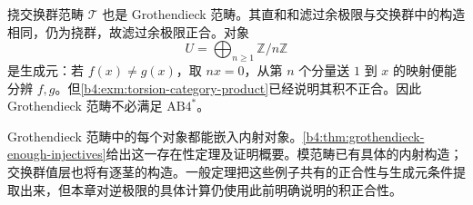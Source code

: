 \begin{example}\label{b4:exm:torsion-grothendieck}
	挠交换群范畴 \(\mathcal T\) 也是 Grothendieck 范畴。其直和和滤过余极限与交换群中的构造相同，仍为挠群，故滤过余极限正合。对象
	\[
		U=\bigoplus_{n\ge1}\mathbb Z/n\mathbb Z
	\]
	是生成元：若 \(f(x)\ne g(x)\)，取 \(nx=0\)，从第 \(n\) 个分量送 \(1\) 到 \(x\) 的映射便能分辨 \(f,g\)。但\cref{b4:exm:torsion-category-product}已经说明其积不正合。因此 Grothendieck 范畴不必满足 \(\mathrm{AB4}^*\)。
\end{example}

Grothendieck 范畴中的每个对象都能嵌入内射对象。\cref{b4:thm:grothendieck-enough-injectives}给出这一存在性定理及证明概要。模范畴已有具体的内射构造；交换群值层也将有逐茎的构造。一般定理把这些例子共有的正合性与生成元条件提取出来，但本章对逆极限的具体计算仍使用此前明确说明的积正合性。
